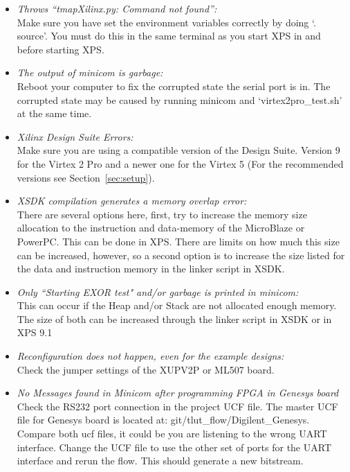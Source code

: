 \documentclass[a4paper,oneside]{memoir}
\begin{document}
\begin{itemize}
\item \emph{Throws ``tmapXilinx.py: Command not found'':}\\
Make sure you have set the environment variables correctly by doing `. source'. You must do this in the same terminal as you start XPS in and before starting XPS.
\item \emph{The output of minicom is garbage:}\\
Reboot your computer to fix the corrupted state the serial port is in. The corrupted state may be caused by running minicom and `virtex2pro\_test.sh' at the same time.
\item \emph{Xilinx Design Suite Errors:}\\
Make sure you are using a compatible version of the Design Suite. Version 9 for the Virtex 2 Pro and a newer one for the Virtex 5 (For the recommended versions see Section~\ref{sec:setup}).
\item \emph{XSDK compilation generates a memory overlap error:}\\
There are several options here, first, try to increase the memory size allocation to the instruction and data-memory of the MicroBlaze or PowerPC. This can be done in XPS. There are limits on how much this size can be increased, however, so a second option is to increase the size listed for the data and instruction memory in the linker script in XSDK. 
\item \emph{Only ``Starting EXOR test" and/or garbage is printed in minicom:}\\
This can occur if the Heap and/or Stack are not allocated enough memory. The size of both can be increased through the linker script in XSDK or in XPS 9.1
\item \emph{Reconfiguration does not happen, even for the example designs:}\\
Check the jumper settings of the XUPV2P or ML507 board.
\item \emph{No Messages found in Minicom after programming FPGA in Genesys board}\\
Check the RS232 port connection in the project UCF file. The master UCF file for Genesys board is located at: git/tlut\_flow/Digilent\_Genesys. Compare both ucf files, it could be you are listening to the wrong UART interface. Change the UCF file to use the other set of ports for the UART interface and rerun the flow. This should generate a new bitstream.
\end{itemize}
\end{document}
